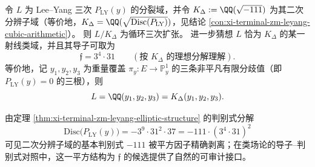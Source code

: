 \begin{conjecture}\label{conj:xi-terminal-zm-leyang-ray-class-field}
令 \(L\) 为 Lee--Yang 三次 \(P_{\mathrm{LY}}(y)\) 的分裂域，并令
\(
K_{\Delta}:=\QQ(\sqrt{-111})
\)
为其二次分辨子域（等价地，\(K_{\Delta}=\QQ(\sqrt{\mathrm{Disc}(P_{\mathrm{LY}})})\)，见结论 \ref{con:xi-terminal-zm-leyang-cubic-arithmetic}）。
则 \(L/K_{\Delta}\) 为循环三次扩张。
进一步猜想 \(L\) 恰为 \(K_{\Delta}\) 的某一射线类域，并且其导子可取为
\[
\mathfrak f=3^{4}\cdot 31
\qquad(\text{按 }K_{\Delta}\text{ 的理想分解理解}).
\]
等价地，记 \(y_1,y_2,y_3\) 为重量覆盖 \(\pi_y:E\to\mathbb P^1_y\) 的三条非平凡有限分歧值（即 \(P_{\mathrm{LY}}(y)=0\) 的三根），则
\[
L=\QQ(y_1,y_2,y_3)=K_{\Delta}(y_1,y_2,y_3).
\]
\end{conjecture}

\begin{remark}[判别式分解与导子候选]\label{rem:xi-terminal-zm-leyang-rayclass-discriminant-motivation}
由定理 \ref{thm:xi-terminal-zm-leyang-elliptic-structure} 的判别式分解
\[
\mathrm{Disc}\bigl(P_{\mathrm{LY}}(y)\bigr)=-3^{9}\cdot 31^{2}\cdot 37
=-111\cdot(3^{4}\cdot 31)^{2}
\]
可见二次分辨子域的基本判别式 \(-111\) 被平方因子精确剥离；在类场论的导子--判别式对照中，这一平方结构为 \(\mathfrak f\) 的候选提供了自然的可审计接口。
\end{remark}

